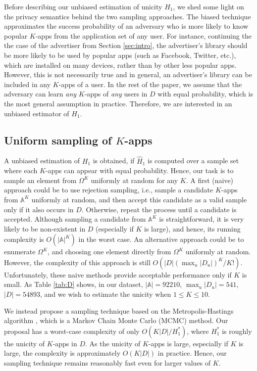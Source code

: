 \documentclass{acm_proc_article-sp}
\theoremstyle{plain}
\theoremstyle{plain}
\theoremstyle{plain}
\theoremstyle{plain}
\theoremstyle{plain}
\theoremstyle{plain}
\begin{document}
Before describing our unbiased estimation of unicity $H_1$, we shed some light on the privacy semantics behind the two sampling approaches.  
The biased technique approximates the success probability of an adversary who is more likely to know popular $K$-apps from the application set of any user. 
For instance, continuing the the case of the advertiser from Section \ref{sec:intro}, the advertiser's library should be more likely to be used by popular apps (such as Facebook, Twitter, etc.), 
which are installed on many devices, rather than by other less popular apps. 
However, this is not necessarily true and in general, an advertiser's library can be included in any $K$-apps of a user.
In the rest of the paper, we assume that the adversary can learn \emph{any} $K$-apps of \emph{any} users in $D$ with equal probability, which is the most general assumption in practice. 
Therefore, we  are interested in an unbiased estimator of $H_1$. 


\subsection{Uniform sampling of $K$-apps}
\label{sec:uniform_sampling}

 A unbiased estimation of $H_1$ is obtained, if $\hat{H}_1$ is computed over a sample set where each $K$-apps can appear with equal probability.
Hence, our task is to sample an element from $\Omega^K$ uniformly at random for any $K$. A first (naive) approach could be to use rejection sampling, i.e., sample a candidate $K$-apps from $\mathbb{A}^K$ uniformly at random, and then accept this candidate as a valid sample only if it also occurs in $D$. Otherwise, repeat the process until a candidate is accepted.  Although sampling a candidate from $\mathbb{A}^K$ is straightforward, it is very likely to be non-existent in $D$ (especially if $K$ is large), and hence, its running complexity is $O(|\mathbb{A}|^K)$ in the worst case. An alternative approach could be to enumerate $\Omega^K$, and choosing one element directly from $\Omega^K$ uniformly at random. However, the complexity of this approach is still $O(|D|(\max_u|D_u|)^K/K!)$. Unfortunately, these naive methods provide acceptable performance only if $K$ is small. As Table \ref{tab:D} shows, in our dataset, $|\mathbb{A}| = 92210$, $\max_u|D_u| = 541$, $|D| = 54893$, and we wish to estimate the unicity when $1\leq K \leq 10$. 

We instead propose a  sampling technique based on the Metropolis-Hastings algorithm \cite{MRRTT53jcp, Chib95}, which is a Markov Chain Monte Carlo (MCMC) method. Our proposal has a worst-case complexity of only $O(K|D|/H_1^*)$, where $H_1^*$ is roughly the unicity of $K$-apps in $D$.  As the unicity of $K$-apps is large, especially if $K$ is large, the complexity is approximately $O(K|D|)$ in practice. Hence, our sampling technique remains reasonably fast even for larger values of $K$.
\end{document}
